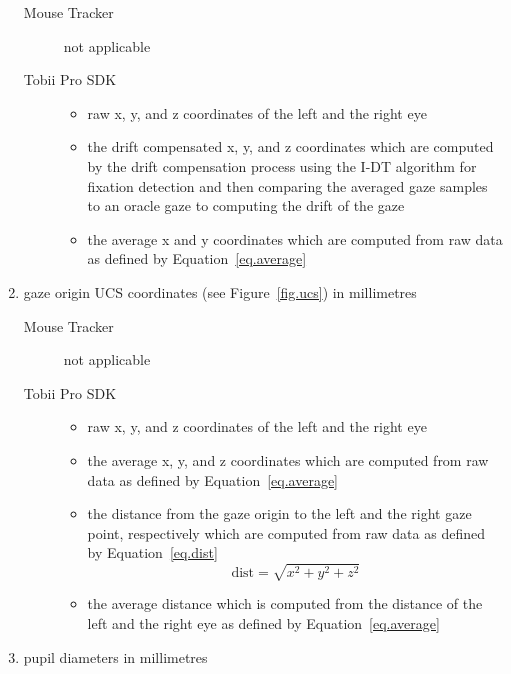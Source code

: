 \documentclass[a4paper,oneside]{book}
\begin{document}
\begin{enumerate}
        \begin{description}
            \item[Mouse Tracker] not applicable
            \item[Tobii Pro SDK] \hfill
                \begin{itemize}
                    \item raw x, y, and z coordinates of the left and the right eye
                    \item the drift compensated x, y, and z coordinates which are computed by the drift compensation process using the I-DT algorithm for fixation detection and then comparing the averaged gaze samples to an oracle gaze to computing the drift of the gaze
                    \item the average x and y coordinates which are computed from raw data as defined by Equation~\ref{eq.average}
                \end{itemize}
        \end{description}
    \item gaze origin UCS coordinates (see Figure~\ref{fig.ucs}) in millimetres
        \begin{description}
            \item[Mouse Tracker] not applicable
            \item[Tobii Pro SDK] \hfill
                \begin{itemize}
                    \item raw x, y, and z coordinates of the left and the right eye
                    \item the average x, y, and z coordinates which are computed from raw data as defined by Equation~\ref{eq.average}
                    \item the distance from the gaze origin to the left and the right gaze point, respectively which are computed from raw data as defined by Equation~\ref{eq.dist}
\begin{equation}
    \label{eq.dist}
    \text{dist} = \sqrt{x^2 + y^2 + z^2}
\end{equation}
                    \item the average distance which is computed from the distance of the left and the right eye as defined by Equation~\ref{eq.average}
                \end{itemize}
        \end{description}
    \item pupil diameters in millimetres
        \begin{description}

\end{description}
\end{enumerate}
\end{document}
